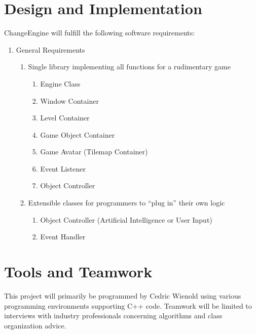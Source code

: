 \documentclass[12pt]{article}
\begin{document}
  \section{Design and Implementation}
    ChangeEngine will fulfill the following software requirements:

\begin{enumerate}
  \item General Requirements

  \begin{enumerate}
    \item Single library implementing all functions for a rudimentary game

    \begin{enumerate}
      \item Engine Class
      \item Window Container
      \item Level Container
      \item Game Object Container
      \item Game Avatar (Tilemap Container)
      \item Event Listener
      \item Object Controller
    \end{enumerate}

    \item Extensible classes for programmers to ``plug in'' their own logic

    \begin{enumerate}
      \item Object Controller (Artificial Intelligence or User Input)
      \item Event Handler
    \end{enumerate}

  \end{enumerate}

\end{enumerate}

  \section{Tools and Teamwork}
    This project will primarily be programmed by Cedric Wienold using various programming environments supporting C++ code. Teamwork will be limited to interviews with industry professionals concerning algorithms and class organization advice.
\end{document}
